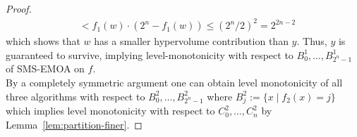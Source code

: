 {\begin{proof}
\begin{align*}
    &< f_1(w) \cdot (2^n - f_1(w)) \leq (2^n/2)^2 = 2^{2n-2}
    \end{align*}
    which shows that $w$ has a smaller hypervolume contribution than $y$. Thus, $y$ is guaranteed to survive, implying level-monotonicity with respect to $B_0^1, \ldots , B_{2^n-1}^1$ of SMS-EMOA on $f$.\\
    By a completely symmetric argument one can obtain level monotonicity of all three algorithms with respect to $B_0^2, \ldots , B_{2^n-1}^2$ where $B_j^2:=\{x \mid f_2(x)=j\}$ which implies level monotonicity with respect to $C_0^2, \ldots , C_n^2$ by Lemma~\ref{lem:partition-finer}. %
\end{proof}}



